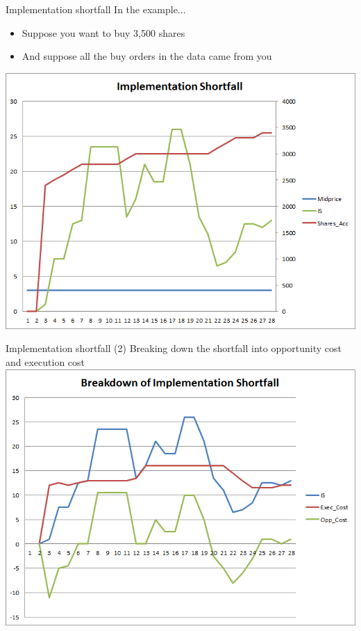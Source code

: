 \documentclass[english,10pt]{beamer}
\begin{document}
\begin{frame}{Implementation shortfall}
	In the example... 
	\begin{itemize}
		\item Suppose you want to buy 3,500 shares
		\item And suppose all the buy orders in the data came from you
	\end{itemize}
	\center
	\includegraphics[scale=0.39]{pics/L2_is}
\end{frame}


\begin{frame}{Implementation shortfall (2)}
	Breaking down the shortfall into opportunity cost and execution cost
	\center
	\includegraphics[scale=0.39]{pics/L2_is2}
\end{frame}
\end{document}

